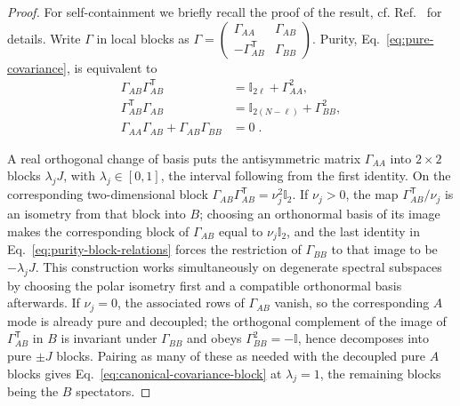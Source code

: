 \documentclass[aps,prl,twocolumn,superscriptaddress,reprint,longbibliography,nofootinbib]{revtex4-2}
\newcommand{\trans}{\mathsf{T}}
\begin{document}
\begin{proof}
For self-containment we briefly recall the proof of the result, cf. Ref.~\cite{BoteroReznik2004} for details.
Write $\Gamma$ in local blocks as $\Gamma=\left(\begin{smallmatrix} \Gamma_{AA}&\Gamma_{AB}\\ -\Gamma_{AB}^{\trans}&\Gamma_{BB}\end{smallmatrix}\right)$. Purity, Eq.~\eqref{eq:pure-covariance}, is equivalent to
\begin{equation}\begin{split}\Gamma_{AB}\Gamma_{AB}^{\trans}&=\mathbb{I}_{2\ell}+\Gamma_{AA}^2,\\ \Gamma_{AB}^{\trans}\Gamma_{AB}&=\mathbb{I}_{2(N-\ell)}+\Gamma_{BB}^2,\\ \Gamma_{AA}\Gamma_{AB}+\Gamma_{AB}\Gamma_{BB}&=0\;.
    \label{eq:purity-block-relations}
\end{split}\end{equation}

A real orthogonal change of basis puts the antisymmetric matrix $\Gamma_{AA}$  into $2\times 2$ blocks $\lambda_jJ$, with $\lambda_j\in[0,1]$, the interval following from the first identity. On the corresponding two-dimensional block $\Gamma_{AB}\Gamma_{AB}^{\trans}=\nu_j^2\mathbb{I}_2$. If $\nu_j>0$, the map $\Gamma_{AB}^{\trans}/\nu_j$ is an isometry from that block into $B$; choosing an orthonormal basis of its image makes the corresponding block of $\Gamma_{AB}$ equal to $\nu_j\mathbb{I}_2$, and the last identity in Eq.~\eqref{eq:purity-block-relations} forces the restriction of $\Gamma_{BB}$ to that image to be $-\lambda_jJ$. This construction works simultaneously on degenerate spectral subspaces by choosing the polar isometry first and a compatible orthonormal basis afterwards. If $\nu_j=0$, the associated rows of $\Gamma_{AB}$ vanish, so the corresponding $A$ mode is already pure and decoupled; the orthogonal complement of the image of $\Gamma_{AB}^{\trans}$  in $B$ is invariant under $\Gamma_{BB}$ and obeys $\Gamma_{BB}^2=-\mathbb{I}$, hence decomposes into pure $\pm J$ blocks. Pairing as many of these as needed with the decoupled pure $A$ blocks gives Eq.~\eqref{eq:canonical-covariance-block} at $\lambda_j=1$, the remaining blocks being the $B$ spectators.
\end{proof}
\end{document}

